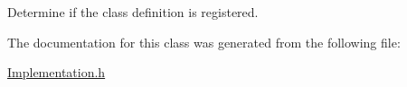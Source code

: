 Determine if the class definition is registered. 



The documentation for this class was generated from the following file\+:\begin{DoxyCompactItemize}
\item 
\hyperlink{Implementation_8h}{Implementation.\+h}\end{DoxyCompactItemize}
